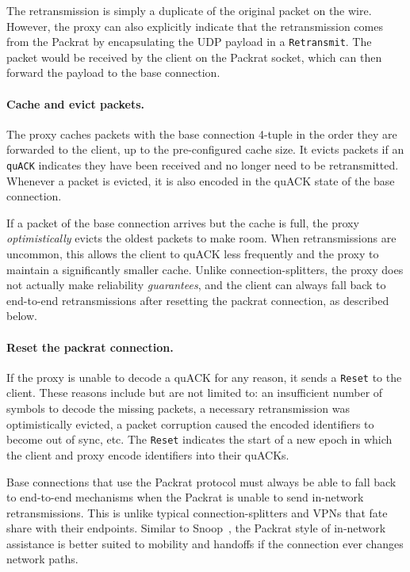 The retransmission is simply a duplicate of the original packet on the wire.
However, the proxy can also explicitly indicate that the retransmission comes
from the Packrat by encapsulating the UDP payload in a \texttt{Retransmit}. The
packet would be received by the client on the Packrat socket, which can then forward
the payload to the base connection.

\paragraph{Cache and evict packets.}

The proxy caches packets with the base connection 4-tuple in the order they are
forwarded to the client, up to the pre-configured cache size. It evicts packets
if an \texttt{quACK} indicates they have been received and no longer need to be
retransmitted. Whenever a packet is evicted, it is also encoded in the quACK
state of the base connection.

If a packet of the base connection arrives but the cache is full, the
proxy \textit{optimistically} evicts the oldest packets to make room. When
retransmissions are uncommon, this allows the client to quACK less frequently
and the proxy to maintain a significantly smaller cache. Unlike
connection-splitters, the proxy does not actually make reliability \textit
{guarantees}, and the client can always fall back to end-to-end retransmissions
after resetting the packrat connection, as described below.

\paragraph{Reset the packrat connection.}

If the proxy is unable to decode a quACK for any reason, it sends a \texttt
{Reset} to the client. These reasons include but are not limited to: an
insufficient number of symbols to decode the missing packets, a necessary
retransmission was optimistically evicted,
a packet corruption caused the encoded identifiers
to become out of sync, etc. The \texttt{Reset} indicates the start of a new
epoch in which the client and proxy encode identifiers into their quACKs.

Base connections that use the Packrat protocol must always be able to fall back to
end-to-end mechanisms when the Packrat is unable to send in-network
retransmissions. This is unlike typical connection-splitters and VPNs that fate
share with their endpoints. Similar to Snoop~\cite{balakrishnan1995snoop},
the Packrat style of in-network
assistance is better suited to mobility and handoffs if the connection ever
changes network paths.


